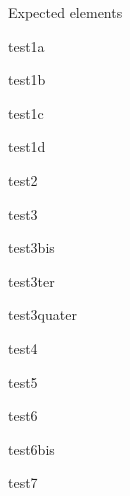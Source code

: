 \documentclass[pdftex, 11pt]{beamer}
\newcommand{\svntitlesize}{\tiny}
\newcommand{\svnbodysize}{\tiny}
\begin{document}
\begin{frame}[fragile]{Expected elements}
  \begin{block}{\svntitlesize test1a}
    \svnbodysize
    
  \end{block}
  \begin{block}{\svntitlesize test1b}
    \svnbodysize
    
  \end{block}
  \begin{block}{\svntitlesize test1c}
    \svnbodysize
    
  \end{block}
  \begin{block}{\svntitlesize test1d}
    \svnbodysize
    
  \end{block}
\end{frame}

\begin{frame}[fragile]
  \begin{block}{\svntitlesize test2}
    \svnbodysize
    
  \end{block}
  \begin{block}{\svntitlesize test3}
    \svnbodysize
    
  \end{block}
  \begin{block}{\svntitlesize test3bis}
    \svnbodysize
    
  \end{block}
\end{frame}

\begin{frame}[fragile]
  \begin{block}{\svntitlesize test3ter}
    \svnbodysize
    
  \end{block}
  \begin{block}{\svntitlesize test3quater}
    \svnbodysize
    
  \end{block}
  \begin{block}{\svntitlesize test4}
    \svnbodysize
    
  \end{block}
  \begin{block}{\svntitlesize test5}
    \svnbodysize
    
  \end{block}
\end{frame}

\begin{frame}[fragile]
  \begin{block}{\svntitlesize test6}
    \svnbodysize
    
  \end{block}
  \begin{block}{\svntitlesize test6bis}
    \svnbodysize
    
  \end{block}
  \begin{block}{\svntitlesize test7}
    \svnbodysize
    
  \end{block}
\end{frame}
\end{document}

